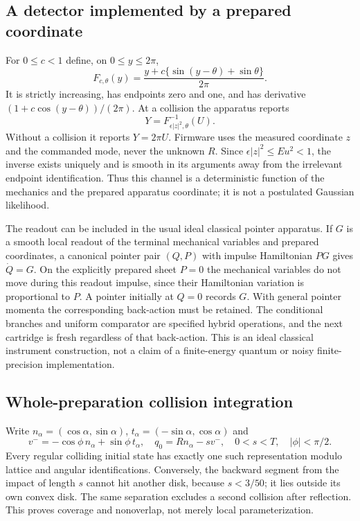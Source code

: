 \subsection{A detector implemented by a prepared coordinate}
For $0\le c<1$ define, on $0\le y\le2\pi$,
\begin{equation}
 F_{c,\theta}(y)=
 \frac{y+c\{\sin(y-\theta)+\sin\theta\}}{2\pi}.
 \label{eq:detector-cdf}
\end{equation}
It is strictly increasing, has endpoints zero and one, and has derivative
$(1+c\cos(y-\theta))/(2\pi)$. At a collision the apparatus reports
\begin{equation}
 Y=F_{\epsilon |z|^2,\theta}^{-1}(U).
 \label{eq:detector-map}
\end{equation}
Without a collision it reports $Y=2\pi U$. Firmware uses the measured
coordinate $z$ and the commanded mode, never the unknown $R$. Since
$\epsilon |z|^2\le Eu^2<1$, the inverse exists uniquely and is smooth in
its arguments away from the irrelevant endpoint identification. Thus this
channel is a deterministic function of the mechanics and the prepared
apparatus coordinate; it is not a postulated Gaussian likelihood.

The readout can be included in the usual ideal classical pointer apparatus.
If $G$ is a smooth local readout of the terminal mechanical variables and
prepared coordinates, a canonical pointer pair $(Q,P)$ with impulse
Hamiltonian $PG$ gives $\dot Q=G$. On the explicitly prepared sheet $P=0$
the mechanical variables do not move during this readout impulse, since
their Hamiltonian variation is proportional to $P$. A pointer initially at
$Q=0$ records $G$. With general pointer momenta the corresponding back-action
must be retained. The conditional branches and uniform comparator are
specified hybrid operations, and the next cartridge is fresh regardless of
that back-action. This is an ideal classical instrument construction, not a
claim of a finite-energy quantum or noisy finite-precision implementation.

\subsection{Whole-preparation collision integration}
Write $n_\alpha=(\cos\alpha,\sin\alpha)$,
$t_\alpha=(-\sin\alpha,\cos\alpha)$ and
\begin{equation}
 v^-=-\cos\phi\,n_\alpha+\sin\phi\,t_\alpha,\quad
 q_0=Rn_\alpha-sv^-,\quad
 0<s<T,\quad |\phi|<\pi/2.
 \label{eq:tube}
\end{equation}
Every regular colliding initial state has exactly one such representation
modulo lattice and angular identifications. Conversely, the backward segment
from the impact of length $s$ cannot hit another disk, because $s<3/50$;
it lies outside its own convex disk. The same separation excludes a second
collision after reflection. This proves coverage and nonoverlap, not merely
local parameterization.

